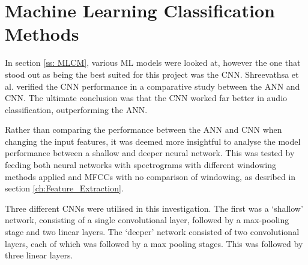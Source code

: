 \documentclass[class=report,11pt,crop=false]{standalone}
\begin{document}
\ifstandalone
\tableofcontents
\fi
\section{Machine Learning Classification Methods \label{ch:ML_Methods}}




In section \ref{ss: MLCM}, various ML models were looked at, however the one that stood out as being the best suited for this project was the CNN. Shreevathsa et al. \cite{Shreevathsa_2020} verified the CNN performance in a comparative study between the ANN and CNN. The ultimate conclusion was that the CNN worked far better in audio classification, outperforming the ANN. 

Rather than comparing the performance between the ANN and CNN when changing the input features, it was deemed more insightful to analyse the model performance between a shallow and deeper neural network. This was tested by feeding both neural networks with spectrograms with different windowing methods applied and MFCCs with no comparison of windowing, as desribed in section \ref{ch:Feature_Extraction}. 

Three different CNNs were utilised in this investigation. The first was a `shallow' network, consisting of a single convolutional layer, followed by a max-pooling stage and two linear layers. The `deeper' network consisted of two convolutional layers, each of which was followed by a max pooling stages. This was followed by three linear layers. 
\end{document}
